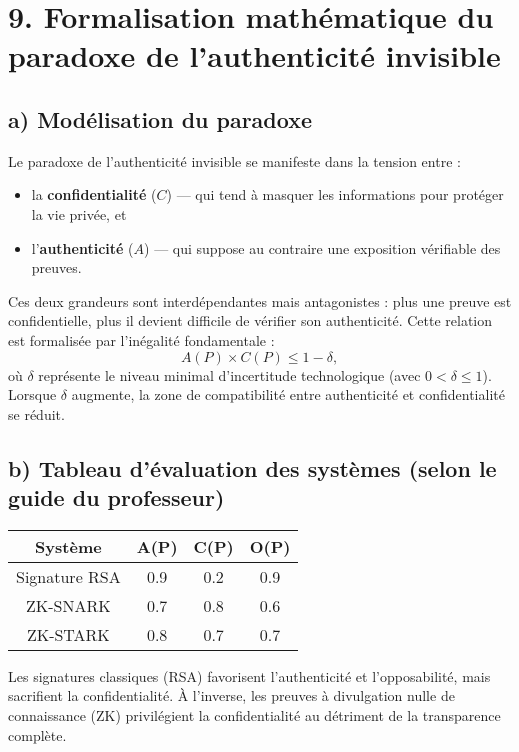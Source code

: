 \documentclass[12pt,a4paper]{report}
\begin{document}
{		\section*{9. Formalisation mathématique du paradoxe de l’authenticité invisible}

\subsection*{a) Modélisation du paradoxe}

Le paradoxe de l’authenticité invisible se manifeste dans la tension entre :
\begin{itemize}
  \item la \textbf{confidentialité} ($C$) — qui tend à masquer les informations pour protéger la vie privée, et
  \item l’\textbf{authenticité} ($A$) — qui suppose au contraire une exposition vérifiable des preuves.
\end{itemize}

Ces deux grandeurs sont interdépendantes mais antagonistes :  
plus une preuve est confidentielle, plus il devient difficile de vérifier son authenticité.  
Cette relation est formalisée par l’inégalité fondamentale :
\[
A(P) \times C(P) \le 1 - \delta,
\]
où $\delta$ représente le niveau minimal d’incertitude technologique (avec $0 < \delta \le 1$).  
Lorsque $\delta$ augmente, la zone de compatibilité entre authenticité et confidentialité se réduit.

\subsection*{b) Tableau d’évaluation des systèmes (selon le guide du professeur)}

\begin{center}
\begin{tabular}{|c|c|c|c|}
\hline
\textbf{Système} & \textbf{A(P)} & \textbf{C(P)} & \textbf{O(P)} \\
\hline
Signature RSA & 0.9 & 0.2 & 0.9 \\
ZK-SNARK & 0.7 & 0.8 & 0.6 \\
ZK-STARK & 0.8 & 0.7 & 0.7 \\
\hline
\end{tabular}
\end{center}

\noindent
Les signatures classiques (RSA) favorisent l’authenticité et l’opposabilité, mais sacrifient la confidentialité.  
À l’inverse, les preuves à divulgation nulle de connaissance (ZK) privilégient la confidentialité au détriment de la transparence complète.

}
\end{document}

